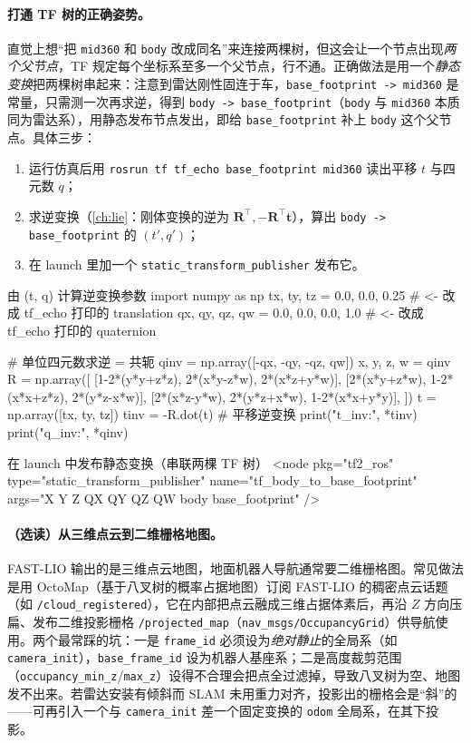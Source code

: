 \paragraph{打通 TF 树的正确姿势。}直觉上想“把 \texttt{mid360} 和 \texttt{body} 改成同名”来连接两棵树，但这会让一个节点出现\emph{两个父节点}，TF 规定每个坐标系至多一个父节点，行不通。正确做法是用一个\emph{静态变换}把两棵树串起来：注意到雷达刚性固连于车，\verb|base_footprint -> mid360| 是常量，只需测一次再求逆，得到 \verb|body -> base_footprint|（\verb|body| 与 \verb|mid360| 本质同为雷达系），用静态发布节点发出，即给 \verb|base_footprint| 补上 \verb|body| 这个父节点。具体三步：

\begin{enumerate}
  \item 运行仿真后用 \verb|rosrun tf tf_echo base_footprint mid360| 读出平移 $t$ 与四元数 $q$；
  \item 求逆变换（\cref{ch:lie}：刚体变换的逆为 $\mathbf{R}^\top,-\mathbf{R}^\top\mathbf{t}$），算出 \verb|body -> base_footprint| 的 $(t',q')$；
  \item 在 launch 里加一个 \verb|static_transform_publisher| 发布它。
\end{enumerate}

\begin{codebox}[Python]{由 (t, q) 计算逆变换参数}
import numpy as np
tx, ty, tz = 0.0, 0.0, 0.25       # <- 改成 tf_echo 打印的 translation
qx, qy, qz, qw = 0.0, 0.0, 0.0, 1.0  # <- 改成 tf_echo 打印的 quaternion

# 单位四元数求逆 = 共轭
qinv = np.array([-qx, -qy, -qz, qw])
x, y, z, w = qinv
R = np.array([
    [1-2*(y*y+z*z), 2*(x*y-z*w),   2*(x*z+y*w)],
    [2*(x*y+z*w),   1-2*(x*x+z*z), 2*(y*z-x*w)],
    [2*(x*z-y*w),   2*(y*z+x*w),   1-2*(x*x+y*y)],
])
t = np.array([tx, ty, tz])
tinv = -R.dot(t)                  # 平移逆变换
print("t_inv:", *tinv)
print("q_inv:", *qinv)
\end{codebox}

\begin{codebox}[text]{在 launch 中发布静态变换（串联两棵 TF 树）}
<node pkg="tf2_ros" type="static_transform_publisher"
      name="tf_body_to_base_footprint"
      args="X Y Z QX QY QZ QW body base_footprint" />
\end{codebox}

\paragraph{（选读）从三维点云到二维栅格地图。}FAST-LIO 输出的是三维点云地图，地面机器人导航通常要二维栅格图。常见做法是用 OctoMap\cite{hornung2013octomap}（基于八叉树的概率占据地图）订阅 FAST-LIO 的稠密点云话题（如 \verb|/cloud_registered|），它在内部把点云融成三维占据体素后，再沿 $Z$ 方向压扁、发布二维投影栅格 \verb|/projected_map|（\verb|nav_msgs/OccupancyGrid|）供导航使用。两个最常踩的坑：一是 \verb|frame_id| 必须设为\emph{绝对静止}的全局系（如 \verb|camera_init|），\verb|base_frame_id| 设为机器人基座系；二是高度裁剪范围（\verb|occupancy_min_z|/\verb|max_z|）设得不合理会把点全过滤掉，导致八叉树为空、地图发不出来。若雷达安装有倾斜而 SLAM 未用重力对齐，投影出的栅格会是“斜”的——可再引入一个与 \verb|camera_init| 差一个固定变换的 \verb|odom| 全局系，在其下投影。

